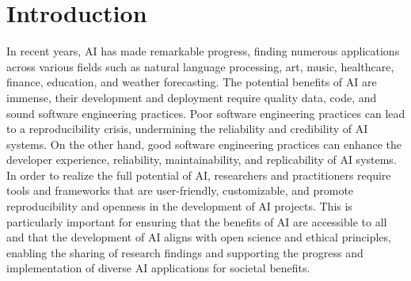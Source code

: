
\section{Introduction}


 In recent years, AI has made remarkable progress, finding numerous applications across various fields such as natural language processing, art, music, healthcare, finance, education, and weather forecasting. The potential benefits of AI are immense, their development and deployment require quality data, code, and sound software engineering practices. Poor software engineering practices can lead to a reproducibility crisis, undermining the reliability and credibility of AI systems. On the other hand, good software engineering practices can enhance the developer experience, reliability, maintainability, and replicability of AI systems. In order to realize the full potential of AI, researchers and practitioners require tools and frameworks that are user-friendly, customizable, and promote reproducibility and openness in the development of AI projects. This is particularly important for ensuring that the benefits of AI are accessible to all and that the development of AI aligns with open science and ethical principles, enabling the sharing of research findings and supporting the progress and implementation of diverse AI applications for societal benefits.


